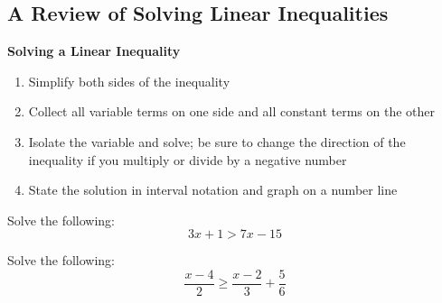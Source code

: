 \setcounter{section}{9}
\setcounter{subsection}{0}

\subsection{A Review of Solving Linear Inequalities}

\begin{mdframed}
\textbf{Solving a Linear Inequality}
\begin{enumerate}
\item Simplify both sides of the inequality
\item Collect all variable terms on one side and all constant terms on the other
\item Isolate the variable and solve; be sure to change the direction of the inequality if you multiply or divide by a negative number
\item State the solution in interval notation and graph on a number line
\end{enumerate}
\end{mdframed}

\vspace{.2in}

\begin{example}
Solve the following: \[3x + 1 > 7x - 15\]
\vspace{1.5in}
\end{example}

\begin{example}
Solve the following: \[\dfrac{x-4}{2} \ge \dfrac{x-2}{3}+\dfrac{5}{6}\]
\vspace{2in}
\end{example}
